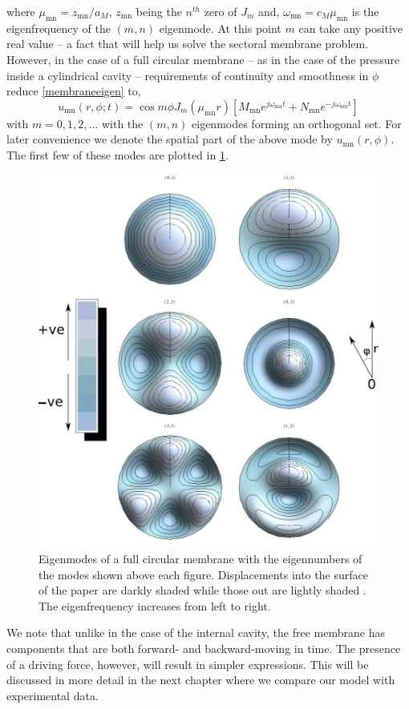 where $\mu_{\mathrm{mn}}=z_{\mathrm{mn}}/a_M$, $z_{\mathrm{mn}}$ being the $n^{th}$ zero of $J_m$ and, $\omega_{\mathrm{mn}}=c_M\mu_{\mathrm{mn}}$ is
the eigenfrequency of the $(m,n)$ eigenmode. At this point $m$ can take any positive real value -- a fact that will
help us solve the sectoral membrane problem. However, in the case of a full circular membrane -- as in the case
of the pressure inside a cylindrical cavity -- requirements of continuity and smoothness in $\phi$ reduce \eqref{membraneeigen}
to,
\begin{equation}\label{circularmembraneeigen}
 u_{\mathrm{mn}}(r,\phi;t)=\cos m\phi J_m(\mu_{\mathrm{mn}} r)\left[M_{\mathrm{mn}}e^{j\omega_{\mathrm{mn}} t}+N_{\mathrm{mn}}e^{-j\omega_{\mathrm{mn}} t}\right]
\end{equation}
with $m=0,1,2,\ldots$ with the $(m,n)$ eigenmodes forming an orthogonal set. For later convenience we denote the spatial
part of the above mode by $u_{\mathrm{mn}}(r,\phi)$. The first few of these modes are plotted in \ref{circularmembraneeigenmodes}.

\begin{figure}[ht!]
 \centering
 \includegraphics[width=.6\linewidth]{Diagrams/CircularMembraneModes/circular_modes_all.png}
 \caption[Circular membrane eigenmodes]{Eigenmodes of a full circular membrane with the eigennumbers of the modes
 shown above each figure. Displacements into the surface of the paper are darkly shaded while those out are lightly shaded . The eigenfrequency increases from left to right.}
  \label{circularmembraneeigenmodes}
\end{figure}

We note that unlike in the case of the internal cavity, the free membrane has components
that are both forward- and backward-moving in time. The presence of a driving force, however, will result in simpler expressions. This
will be discussed in more detail in the next chapter where we compare our model with experimental data.

